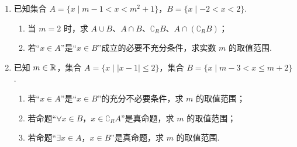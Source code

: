 \documentclass[a4paper,11pt]{article}
\begin{document}
\begin{enumerate}
\ansspace[6]

\item 已知集合 $A=\{x\mid m-1<x<m^2+1\}$，$B=\{x\mid-2<x<2\}$.

\begin{enumerate}[label=(\arabic*)]
\item 当 $m=2$ 时，求 $A\cup B$、$A\cap B$、$\complement_R B$、$A\cap(\complement_R B)$；
\item 若“$x\in A$”是“$x\in B$”成立的必要不充分条件，求实数 $m$ 的取值范围.
\end{enumerate}

\ifanswer
\solbegin
{}
\solend

\fi

\ansspace[6]

\item 已知 $m\in\mathbb{R}$，集合 $A=\{x\mid|x-1|\leqslant2\}$，集合
$B=\{x\mid m-3<x\leqslant m+2\}$.

\begin{enumerate}[label=(\arabic*)]
\item 若“$x\in A$”是“$x\in B$”的充分不必要条件，求 $m$ 的取值范围；
\item 若命题“$\forall x\in B$，$x\in\complement_R A$”是真命题，求 $m$ 的取值范围；
\item 若命题“$\exists x\in A$，$x\in B$”是真命题，求 $m$ 的取值范围.
\end{enumerate}


\end{enumerate}
\end{document}
